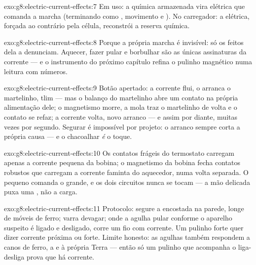\begin{solution}{exo:g8:electric-current-effects:7}
Em uso: a  química armazenada vira  elétrica que
comanda a marcha (terminando como , movimento e ). No
carregador: a  elétrica, forçada ao contrário pela célula,
reconstrói a reserva química.
\end{solution}

\begin{solution}{exo:g8:electric-current-effects:8}
Porque a própria marcha é invisível: só os feitos dela a denunciam.
Aquecer, fazer pular e borbulhar são as únicas assinaturas da
corrente --- e o instrumento do próximo capítulo refina o pulinho
magnético numa leitura com números.
\end{solution}

\begin{solution}{exo:g8:electric-current-effects:9}
Botão apertado: a corrente flui, o  arranca o martelinho,
tlim --- mas o balanço do martelinho abre um contato na própria
alimentação dele; o magnetismo morre, a mola traz o martelinho de
volta e o contato se refaz; a corrente volta, novo arranco --- e
assim por diante, muitas vezes por segundo. Segurar é impossível por
projeto: o arranco sempre corta a própria causa --- e o chacoalhar
\emph{é} o toque.
\end{solution}

\begin{solution}{exo:g8:electric-current-effects:10}
Os contatos frágeis do termostato carregam apenas a corrente pequena
da bobina; o magnetismo da bobina fecha contatos robustos que
carregam a corrente faminta do aquecedor, numa volta separada. O
pequeno comanda o grande, e os dois circuitos nunca se tocam --- a
mão delicada puxa uma , não a carga.
\end{solution}

\begin{solution}{exo:g8:electric-current-effects:11}
Protocolo: segure a  encostada na parede, longe de móveis de
ferro; varra devagar; onde a agulha pular conforme o aparelho suspeito
é ligado e desligado, corre um fio com corrente. Um pulinho forte
quer dizer corrente próxima ou forte. Limite honesto: as agulhas
também respondem a canos de ferro, a  e à própria Terra --- então
só um pulinho que acompanha o liga-desliga prova que há corrente.
\end{solution}


